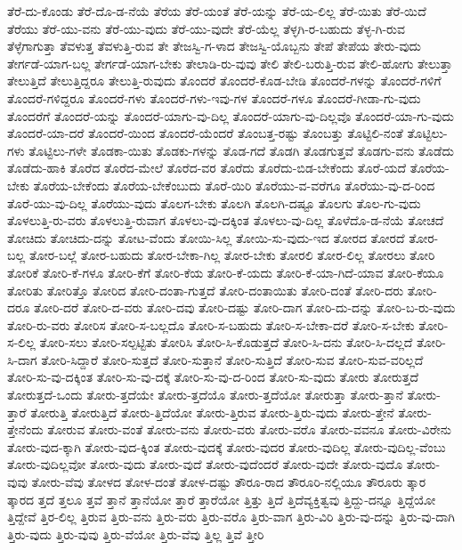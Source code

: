 {ತೆರೆ-ದು-ಕೊಂಡು
ತೆರೆ-ದೊ-ಡ-ನೆಯೆ
ತೆರೆಯ
ತೆರೆ-ಯಂತೆ
ತೆರೆ-ಯನ್ನು
ತೆರೆ-ಯ-ಲಿಲ್ಲ
ತೆರೆ-ಯಿತು
ತೆರೆ-ಯಿದೆ
ತೆರೆಯು
ತೆರೆ-ಯು-ವನು
ತೆರೆ-ಯು-ವುದು
ತೆರೆ-ಯು-ವುದೇ
ತೆರೆ-ಯೆಲ್ಲ
ತೆಳ್ಳಗಿ-ರ-ಬಹುದು
ತೆಳ್ಳ-ಗಿ-ರುವ
ತೆಳ್ಳೆಗಾಗುತ್ತಾ
ತೆವಳುತ್ತ
ತೆವಳುತ್ತಿ-ರುವ
ತೇ
ತೇಜಸ್ವಿ-ಗ-ಳಾದ
ತೇಜಸ್ವಿ-ಯೊಬ್ಬನು
ತೇಪೆ
ತೇಪೆಯ
ತೇರು-ವುದು
ತೇರ್ಗಡೆ-ಯಾಗ-ಬಲ್ಲ
ತೇರ್ಗಡೆ-ಯಾಗ-ಬೇಕು
ತೇಲಾಡಿ-ರು-ವುವು
ತೇಲಿ
ತೇಲಿ-ಬರುತ್ತಿ-ರುವ
ತೇಲಿ-ಹೋಗು
ತೇಲುತ್ತಾ
ತೇಲುತ್ತಿದೆ
ತೇಲುತ್ತಿದ್ದರೂ
ತೇಲುತ್ತಿ-ರುವುದು
ತೊಂದರೆ
ತೊಂದರೆ-ಕೊಡ-ಬೇಡಿ
ತೊಂದರೆ-ಗಳನ್ನು
ತೊಂದರೆ-ಗಳಿಗೆ
ತೊಂದರೆ-ಗಳಿದ್ದರೂ
ತೊಂದರೆ-ಗಳು
ತೊಂದರೆ-ಗಳು-ಇವು-ಗಳ
ತೊಂದರೆ-ಗಳೂ
ತೊಂದರೆ-ಗೀಡಾ-ಗು-ವುದು
ತೊಂದರೆಗೆ
ತೊಂದರೆ-ಯನ್ನು
ತೊಂದರೆ-ಯಾಗು-ವು-ದಿಲ್ಲ
ತೊಂದರೆ-ಯಾಗು-ವು-ದಿಲ್ಲವೊ
ತೊಂದರೆ-ಯಾ-ಗು-ವುದು
ತೊಂದರೆ-ಯಾ-ದರೆ
ತೊಂದರೆ-ಯಿಂದ
ತೊಂದರೆ-ಯೆಂದರೆ
ತೊಂಬತ್ತ-ರಷ್ಟು
ತೊಂಬತ್ತು
ತೊಟ್ಟಿಲಿ-ನಂತೆ
ತೊಟ್ಟಿಲು-ಗಳು
ತೊಟ್ಟಿಲು-ಗಳೇ
ತೊಡಕಾ-ಯಿತು
ತೊಡಕು-ಗಳನ್ನು
ತೊಡ-ಗದೆ
ತೊಡಗಿ
ತೊಡಗುತ್ತವೆ
ತೊಡಗು-ವನು
ತೊಡೆದು
ತೊಡೆದು-ಹಾಕಿ
ತೊರೆದ
ತೊರೆದ-ಮೇಲೆ
ತೊರೆದ-ವರ
ತೊರೆದು
ತೊರೆದು-ಬಿಡ-ಬೇಕೆಂದು
ತೊರೆ-ಯದೆ
ತೊರೆಯ-ಬೇಕು
ತೊರೆಯ-ಬೇಕೆಂದು
ತೊರೆಯ-ಬೇಕೆಂಬುದು
ತೊರೆ-ಯಿರಿ
ತೊರೆಯು-ವ-ವರೆಗೂ
ತೊರೆಯು-ವು-ದ-ರಿಂದ
ತೊರೆ-ಯು-ವು-ದಿಲ್ಲ
ತೊರೆಯು-ವುದು
ತೊಲಗ-ಬೇಕು
ತೊಲಗಿ
ತೊಲಗಿ-ದಷ್ಟೂ
ತೊಲಗು
ತೊಲ-ಗು-ವುದು
ತೊಳಲುತ್ತಿ-ರು-ವರು
ತೊಳಲುತ್ತಿ-ರುವಾಗ
ತೊಳಲು-ವು-ದಕ್ಕಿಂತ
ತೊಳಲು-ವು-ದಿಲ್ಲ
ತೊಳೆದೊ-ಡ-ನೆಯೆ
ತೋಚದೆ
ತೋಚಿದು
ತೋಚಿದು-ದನ್ನು
ತೋಟ-ವೆಂದು
ತೋಯಿ-ಸಿಲ್ಲ
ತೋಯಿ-ಸು-ವುದು-ಇದ
ತೋರದ
ತೋರದೆ
ತೋರ-ಬಲ್ಲ
ತೋರ-ಬಲ್ಲೆ
ತೋರ-ಬಹುದು
ತೋರ-ಬೇಕಾ-ಗಿಲ್ಲ
ತೋರ-ಬೇಕು
ತೋರಲಿ
ತೋರ-ಲಿಲ್ಲ
ತೋರಲು
ತೋರಿ
ತೋರಿಕೆ
ತೋರಿ-ಕೆ-ಗಳೂ
ತೋರಿ-ಕೆಗೆ
ತೋರಿ-ಕೆಯ
ತೋರಿ-ಕೆ-ಯದು
ತೋರಿ-ಕೆ-ಯಾ-ಗಿದೆ-ಯಾವ
ತೋರಿ-ಕೆಯೂ
ತೋರಿತು
ತೋರಿತ್ತೊ
ತೋರಿದ
ತೋರಿ-ದಂತಾ-ಗುತ್ತದೆ
ತೋರಿ-ದಂತಾಯಿತು
ತೋರಿ-ದಂತೆ
ತೋರಿ-ದರು
ತೋರಿ-ದರೂ
ತೋರಿ-ದರೆ
ತೋರಿ-ದ-ವರು
ತೋರಿ-ದವು
ತೋರಿ-ದಷ್ಟು
ತೋರಿ-ದಾಗ
ತೋರಿ-ದು-ದನ್ನು
ತೋರಿ-ಬ-ರು-ವುದು
ತೋರಿ-ರು-ವರು
ತೋರಿಸ
ತೋರಿ-ಸ-ಬಲ್ಲದೊ
ತೋರಿ-ಸ-ಬಹುದು
ತೋರಿ-ಸ-ಬೇಕಾ-ದರೆ
ತೋರಿ-ಸ-ಬೇಕು
ತೋರಿ-ಸ-ಲಿಲ್ಲ
ತೋರಿ-ಸಲು
ತೋರಿ-ಸಲ್ಪಟ್ಟಿತು
ತೋರಿಸಿ
ತೋರಿ-ಸಿ-ಕೊಡುತ್ತದೆ
ತೋರಿ-ಸಿ-ದನು
ತೋರಿ-ಸಿ-ದಲ್ಲದೆ
ತೋರಿ-ಸಿ-ದಾಗ
ತೋರಿ-ಸಿದ್ದಾರೆ
ತೋರಿ-ಸುತ್ತದೆ
ತೋರಿ-ಸುತ್ತಾನೆ
ತೋರಿ-ಸುತ್ತಿದೆ
ತೋರಿ-ಸುವ
ತೋರಿ-ಸುವ-ವರಿಲ್ಲದೆ
ತೋರಿ-ಸು-ವು-ದಕ್ಕಿಂತ
ತೋರಿ-ಸು-ವು-ದಕ್ಕೆ
ತೋರಿ-ಸು-ವು-ದ-ರಿಂದ
ತೋರಿ-ಸು-ವುದು
ತೋರು
ತೋರುತ್ತದೆ
ತೋರುತ್ತದೆ-ಒಂದು
ತೋರು-ತ್ತದೆಯೇ
ತೋರು-ತ್ತದೆಯೊ
ತೋರು-ತ್ತದೆಯೋ
ತೋರುತ್ತಾ
ತೋರು-ತ್ತಾನೆ
ತೋರು-ತ್ತಾರೆ
ತೋರುತ್ತಿ
ತೋರುತ್ತಿದೆ
ತೋರು-ತ್ತಿದೆಯೋ
ತೋರು-ತ್ತಿರುವ
ತೋರು-ತ್ತಿರು-ವುದು
ತೋರು-ತ್ತೇನೆ
ತೋರು-ತ್ತೇನೆಂದು
ತೋರುವ
ತೋರು-ವಂತೆ
ತೋರು-ವನು
ತೋರು-ವರು
ತೋರು-ವರೊ
ತೋರು-ವವನೂ
ತೋರು-ವಿರೇನು
ತೋರು-ವುದ-ಕ್ಕಾಗಿ
ತೋರು-ವುದ-ಕ್ಕಿಂತ
ತೋರು-ವುದಕ್ಕೆ
ತೋರು-ವುದರ
ತೋರು-ವುದಿಲ್ಲ
ತೋರು-ವುದಿಲ್ಲ-ವೆಂಬು
ತೋರು-ವುದಿಲ್ಲವೋ
ತೋರು-ವುದು
ತೋರು-ವುದೆ
ತೋರು-ವುದೆಂದರೆ
ತೋರು-ವುದೇ
ತೋರು-ವುದೊ
ತೋರು-ವುವು
ತೋರು-ವೆವು
ತೋಳದ
ತೋಳ-ದಂತೆ
ತೋಳ-ದಷ್ಟು
ತೌರೂ-ರಾದ
ತೌರೂರಿ-ನಲ್ಲಿಯೂ
ತೌರೂರು
ತ್ಕಾರ
ತ್ಕಾರದ
ತ್ತದೆ
ತ್ತಲೂ
ತ್ತವೆ
ತ್ತಾನೆ
ತ್ತಾನೆಯೋ
ತ್ತಾರೆ
ತ್ತಾರೆಯೋ
ತ್ತಿತ್ತು
ತ್ತಿದೆ
ತ್ತಿದೆವ್ಯಕ್ತಿತ್ವವು
ತ್ತಿದ್ದು-ದನ್ನೂ
ತ್ತಿದ್ದೆಯೋ
ತ್ತಿದ್ದೇವೆ
ತ್ತಿರ-ಲಿಲ್ಲ
ತ್ತಿರುವ
ತ್ತಿರು-ವನು
ತ್ತಿರು-ವರು
ತ್ತಿರು-ವರೊ
ತ್ತಿರು-ವಾಗ
ತ್ತಿರು-ವಿರಿ
ತ್ತಿರು-ವು-ದನ್ನು
ತ್ತಿರು-ವು-ದಾಗಿ
ತ್ತಿರು-ವುದು
ತ್ತಿರು-ವುವು
ತ್ತಿರು-ವೆಯೋ
ತ್ತಿರು-ವೆವು
ತ್ತಿಲ್ಲ
ತ್ತಿವೆ
ತ್ತೀರಿ
}
